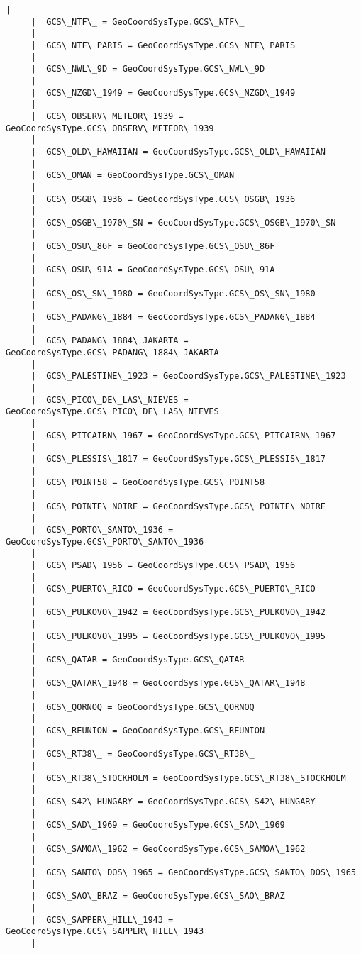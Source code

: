 \documentclass[11pt]{article}
\begin{document}
\begin{Verbatim}[commandchars=\\\{\}]
     |  
     |  GCS\_NTF\_ = GeoCoordSysType.GCS\_NTF\_
     |  
     |  GCS\_NTF\_PARIS = GeoCoordSysType.GCS\_NTF\_PARIS
     |  
     |  GCS\_NWL\_9D = GeoCoordSysType.GCS\_NWL\_9D
     |  
     |  GCS\_NZGD\_1949 = GeoCoordSysType.GCS\_NZGD\_1949
     |  
     |  GCS\_OBSERV\_METEOR\_1939 = GeoCoordSysType.GCS\_OBSERV\_METEOR\_1939
     |  
     |  GCS\_OLD\_HAWAIIAN = GeoCoordSysType.GCS\_OLD\_HAWAIIAN
     |  
     |  GCS\_OMAN = GeoCoordSysType.GCS\_OMAN
     |  
     |  GCS\_OSGB\_1936 = GeoCoordSysType.GCS\_OSGB\_1936
     |  
     |  GCS\_OSGB\_1970\_SN = GeoCoordSysType.GCS\_OSGB\_1970\_SN
     |  
     |  GCS\_OSU\_86F = GeoCoordSysType.GCS\_OSU\_86F
     |  
     |  GCS\_OSU\_91A = GeoCoordSysType.GCS\_OSU\_91A
     |  
     |  GCS\_OS\_SN\_1980 = GeoCoordSysType.GCS\_OS\_SN\_1980
     |  
     |  GCS\_PADANG\_1884 = GeoCoordSysType.GCS\_PADANG\_1884
     |  
     |  GCS\_PADANG\_1884\_JAKARTA = GeoCoordSysType.GCS\_PADANG\_1884\_JAKARTA
     |  
     |  GCS\_PALESTINE\_1923 = GeoCoordSysType.GCS\_PALESTINE\_1923
     |  
     |  GCS\_PICO\_DE\_LAS\_NIEVES = GeoCoordSysType.GCS\_PICO\_DE\_LAS\_NIEVES
     |  
     |  GCS\_PITCAIRN\_1967 = GeoCoordSysType.GCS\_PITCAIRN\_1967
     |  
     |  GCS\_PLESSIS\_1817 = GeoCoordSysType.GCS\_PLESSIS\_1817
     |  
     |  GCS\_POINT58 = GeoCoordSysType.GCS\_POINT58
     |  
     |  GCS\_POINTE\_NOIRE = GeoCoordSysType.GCS\_POINTE\_NOIRE
     |  
     |  GCS\_PORTO\_SANTO\_1936 = GeoCoordSysType.GCS\_PORTO\_SANTO\_1936
     |  
     |  GCS\_PSAD\_1956 = GeoCoordSysType.GCS\_PSAD\_1956
     |  
     |  GCS\_PUERTO\_RICO = GeoCoordSysType.GCS\_PUERTO\_RICO
     |  
     |  GCS\_PULKOVO\_1942 = GeoCoordSysType.GCS\_PULKOVO\_1942
     |  
     |  GCS\_PULKOVO\_1995 = GeoCoordSysType.GCS\_PULKOVO\_1995
     |  
     |  GCS\_QATAR = GeoCoordSysType.GCS\_QATAR
     |  
     |  GCS\_QATAR\_1948 = GeoCoordSysType.GCS\_QATAR\_1948
     |  
     |  GCS\_QORNOQ = GeoCoordSysType.GCS\_QORNOQ
     |  
     |  GCS\_REUNION = GeoCoordSysType.GCS\_REUNION
     |  
     |  GCS\_RT38\_ = GeoCoordSysType.GCS\_RT38\_
     |  
     |  GCS\_RT38\_STOCKHOLM = GeoCoordSysType.GCS\_RT38\_STOCKHOLM
     |  
     |  GCS\_S42\_HUNGARY = GeoCoordSysType.GCS\_S42\_HUNGARY
     |  
     |  GCS\_SAD\_1969 = GeoCoordSysType.GCS\_SAD\_1969
     |  
     |  GCS\_SAMOA\_1962 = GeoCoordSysType.GCS\_SAMOA\_1962
     |  
     |  GCS\_SANTO\_DOS\_1965 = GeoCoordSysType.GCS\_SANTO\_DOS\_1965
     |  
     |  GCS\_SAO\_BRAZ = GeoCoordSysType.GCS\_SAO\_BRAZ
     |  
     |  GCS\_SAPPER\_HILL\_1943 = GeoCoordSysType.GCS\_SAPPER\_HILL\_1943
     |  

\end{Verbatim}
\end{document}
